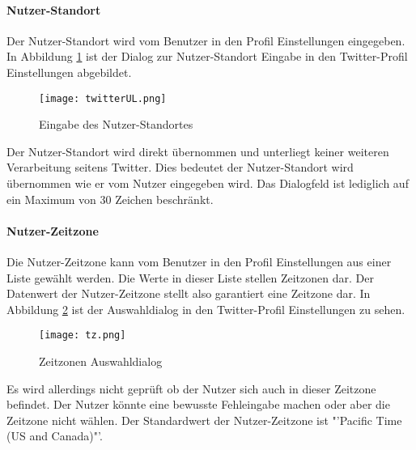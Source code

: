 			\paragraph{Nutzer-Standort} 
				
				Der Nutzer-Standort wird vom Benutzer in den Profil Einstellungen eingegeben.
				In Abbildung \ref{img:twitterLocation} ist der Dialog zur Nutzer-Standort Eingabe in den Twitter-Profil Einstellungen abgebildet.


				\begin{figure}[!ht]
						\begin{center}
							\texttt{[image: twitterUL.png]}
							\caption{Eingabe des Nutzer-Standortes}
							\label{img:twitterLocation}
						\end{center}
					\end{figure}	

				Der Nutzer-Standort wird direkt übernommen und unterliegt keiner weiteren Verarbeitung seitens Twitter.
				Dies bedeutet der Nutzer-Standort wird übernommen wie er vom Nutzer eingegeben wird.
				Das Dialogfeld ist lediglich auf ein Maximum von 30 Zeichen beschränkt. 


			\paragraph{Nutzer-Zeitzone} 

				Die Nutzer-Zeitzone kann vom Benutzer in den Profil Einstellungen aus einer Liste gewählt werden.
				Die Werte in dieser Liste stellen Zeitzonen dar.
				Der Datenwert der Nutzer-Zeitzone stellt also garantiert eine Zeitzone dar. 
				In Abbildung \ref{img:twitterTZ} ist der Auswahldialog in den Twitter-Profil Einstellungen zu sehen.


				\begin{figure}[!ht]
					\begin{center}
						\texttt{[image: tz.png]}
						\caption{Zeitzonen Auswahldialog}
						\label{img:twitterTZ}
					\end{center}
				\end{figure}	

				Es wird allerdings nicht geprüft ob der Nutzer sich auch in dieser Zeitzone befindet.
				Der Nutzer könnte eine bewusste Fehleingabe machen oder aber die Zeitzone nicht wählen.
				Der Standardwert der Nutzer-Zeitzone ist "'Pacific Time (US and Canada)"'.

